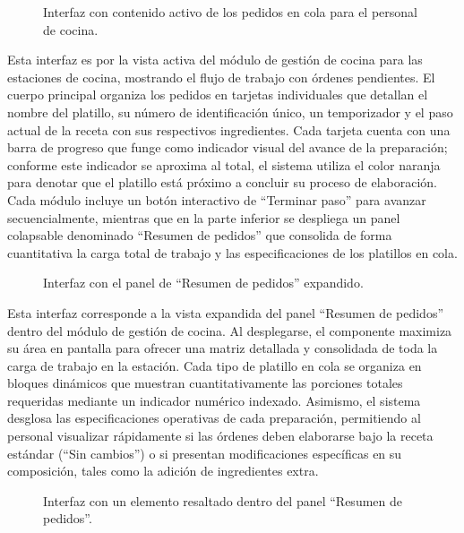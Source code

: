 \begin{figure}[H]
    \centering
    
    \caption{Interfaz con contenido activo de los pedidos en cola para el personal de cocina.}
    \label{fig:ui-coc-02-home}
\end{figure}

Esta interfaz es por la vista activa del módulo de gestión de cocina para las estaciones de cocina, mostrando el flujo de trabajo con órdenes pendientes. El cuerpo principal organiza los pedidos en tarjetas individuales que detallan el nombre del platillo, su número de identificación único, un temporizador y el paso actual de la receta con sus respectivos ingredientes. Cada tarjeta cuenta con una barra de progreso que funge como indicador visual del avance de la preparación; conforme este indicador se aproxima al total, el sistema utiliza el color naranja para denotar que el platillo está próximo a concluir su proceso de elaboración. Cada módulo incluye un botón interactivo de ``Terminar paso'' para avanzar secuencialmente, mientras que en la parte inferior se despliega un panel colapsable denominado ``Resumen de pedidos'' que consolida de forma cuantitativa la carga total de trabajo y las especificaciones de los platillos en cola.

\begin{figure}[H]
    \centering
    
    \caption{Interfaz con el panel de ``Resumen de pedidos'' expandido.}
    \label{fig:ui-coc-02-resumen-pedidos}
\end{figure}

Esta interfaz corresponde a la vista expandida del panel ``Resumen de pedidos'' dentro del módulo de gestión de cocina. Al desplegarse, el componente maximiza su área en pantalla para ofrecer una matriz detallada y consolidada de toda la carga de trabajo en la estación. Cada tipo de platillo en cola se organiza en bloques dinámicos que muestran cuantitativamente las porciones totales requeridas mediante un indicador numérico indexado. Asimismo, el sistema desglosa las especificaciones operativas de cada preparación, permitiendo al personal visualizar rápidamente si las órdenes deben elaborarse bajo la receta estándar (``Sin cambios'') o si presentan modificaciones específicas en su composición, tales como la adición de ingredientes extra.

\begin{figure}[H]
    \centering
    
    \caption{Interfaz con un elemento resaltado dentro del panel ``Resumen de pedidos''.}
    \label{fig:ui-coc-resumen-filtrado}
\end{figure}

